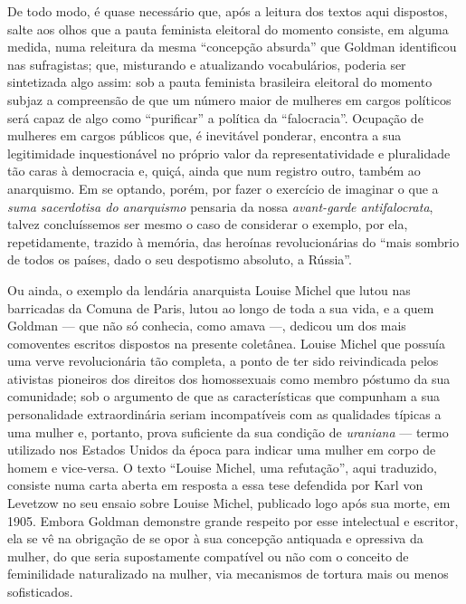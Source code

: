 De todo modo, é quase necessário que, após a leitura dos textos
aqui dispostos, salte aos olhos que a pauta feminista eleitoral do
momento consiste, em alguma medida, numa releitura da mesma ``concepção
absurda'' que Goldman identificou nas sufragistas; que, misturando e
atualizando vocabulários, poderia ser sintetizada algo assim: sob a
pauta feminista brasileira eleitoral do momento subjaz a compreensão de
que um número maior de mulheres em cargos políticos será capaz de algo
como ``purificar'' a política da ``falocracia''. Ocupação de mulheres em
cargos públicos que, é inevitável ponderar, encontra a sua legitimidade
inquestionável no próprio valor da representatividade e pluralidade tão
caras à democracia e, quiçá, ainda que num registro outro, também ao
anarquismo. Em se optando, porém, por fazer o exercício de imaginar o
que a \textit{suma sacerdotisa do anarquismo} pensaria da nossa
\textit{avant-garde antifalocrata}, talvez concluíssemos ser mesmo o
caso de considerar o exemplo, por ela, repetidamente, trazido à memória,
das heroínas revolucionárias do ``mais sombrio de todos os países, dado
o seu despotismo absoluto, a Rússia''. 

Ou ainda, o exemplo da lendária
anarquista Louise Michel que lutou nas barricadas da Comuna de Paris,
lutou ao longo de toda a sua vida, e a quem Goldman --- que não só
conhecia, como amava ---, dedicou um dos mais comoventes escritos
dispostos na presente coletânea. Louise Michel que possuía uma verve
revolucionária tão completa, a ponto de ter sido reivindicada pelos
ativistas pioneiros dos direitos dos homossexuais como membro póstumo da
sua comunidade; sob o argumento de que as características que compunham
a sua personalidade extraordinária seriam incompatíveis com as
qualidades típicas a uma mulher e, portanto, prova suficiente da sua
condição de \textit{uraniana} --- termo utilizado nos Estados Unidos da época
para indicar uma mulher em corpo de homem e vice-versa. O texto ``Louise
Michel, uma refutação'', aqui traduzido, consiste numa carta aberta em
resposta a essa tese defendida por Karl von Levetzow no seu ensaio sobre
Louise Michel, publicado logo após sua morte, em 1905. Embora Goldman
demonstre grande respeito por esse intelectual e escritor, ela se vê na
obrigação de se opor à sua concepção antiquada e opressiva da mulher, do
que seria supostamente compatível ou não com o conceito de
feminilidade naturalizado na mulher, via mecanismos de tortura mais
ou menos sofisticados.

